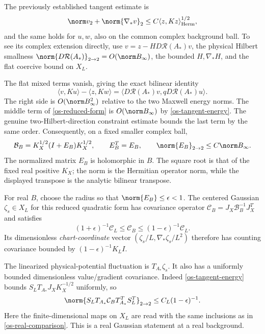 The previously established tangent estimate is
\begin{equation}\label{os-tangent-energy}
 \norm v_2+\norm{\nabla_*v}_2
       \le C\langle z,Kz\rangle_{\rm Herm}^{1/2},
\end{equation}
and the same holds for $u,w$, also on the common complex
background ball. To see its complex extension directly, use
$v=z-HD\mathcal R(A_*)v$, the physical Hilbert smallness
$\norm{D\mathcal R(A_*)}_{2\to2}=O(\norm B_\infty)$,
the bounded $H,\nabla_*H$, and the flat coercive bound on $X_L$.

The flat mixed terms vanish, giving the exact bilinear identity
\begin{equation}\label{os-K-difference}
 \langle v,Ku\rangle-\langle z,Kw\rangle
   =\langle D\mathcal R(A_*)v,
                      q D\mathcal R(A_*)u\rangle.
\end{equation}
The right side is $O(\norm B_\infty^2)$ relative to the two
Maxwell energy norms. The middle term of
\eqref{os-reduced-form} is $O(\norm B_\infty)$ by
\eqref{os-tangent-energy}. The genuine two-Hilbert-direction
constraint estimate bounds the last term by the same order.
Consequently, on a fixed smaller complex ball,
\begin{equation}\label{os-relative-bound}
 \mathcal B_B=K_X^{1/2}(I+E_B)K_X^{1/2},\qquad
 E_B^T=E_B,\qquad \norm{E_B}_{2\to2}\le C\norm B_\infty.
\end{equation}
The normalized matrix $E_B$ is holomorphic in $B$. The square
root is that of the fixed real positive $K_X$; the norm is
the Hermitian operator norm, while the displayed transpose
is the analytic bilinear transpose.

For real $B$, choose the radius so that $\norm{E_B}\le\epsilon<1$.
The centered Gaussian $\zeta_s\in X_L$ for this reduced
quadratic form has covariance operator
$\mathcal C_B=J_X\mathcal B_B^{-1}J_X^T$ and satisfies
\begin{equation}\label{os-real-comparison}
 (1+\epsilon)^{-1}\mathcal C_L
     \le\mathcal C_B\le(1-\epsilon)^{-1}\mathcal C_L.
\end{equation}
Its dimensionless \emph{chart-coordinate} vector
$(\zeta_s/L,\nabla_*\zeta_s/L^2)$ therefore has counting
covariance bounded by $(1-\epsilon)^{-1}K_LI$.

The linearized physical-potential fluctuation is
$T_{A_*}\zeta_s$. It also has a uniformly bounded
dimensionless value/gradient covariance. Indeed
\eqref{os-tangent-energy} bounds
$S_LT_{A_*}J_XK_X^{-1/2}$ uniformly, so
\begin{equation}\label{os-tangent-covariance}
 \norm{S_LT_{A_*}\mathcal C_BT_{A_*}^TS_L^T}_{2\to2}
       \le C_L(1-\epsilon)^{-1}.
\end{equation}
Here the finite-dimensional maps on $X_L$ are read with the
same inclusions as in \eqref{os-real-comparison}. This is a
real Gaussian statement at a real background.

